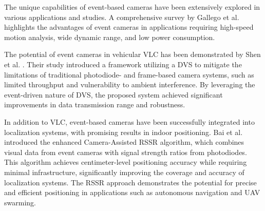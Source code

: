 The unique capabilities of event-based cameras have been extensively explored in various applications and studies.
A comprehensive survey by Gallego et al. \cite{gallego2020event} highlights the advantages of event cameras in
applications requiring high-speed motion analysis, wide dynamic range, and low power consumption.

The potential of event cameras in vehicular \ac{VLC} has been demonstrated by Shen et al.
\cite{shen2019vehicular}. Their study introduced a framework utilizing a \ac{DVS} to mitigate the limitations of
traditional photodiode- and frame-based camera systems, such as limited throughput and vulnerability to ambient
interference. By leveraging the event-driven nature of DVS, the proposed system achieved significant improvements
in data transmission range and robustness.

In addition to VLC, event-based cameras have been successfully integrated into localization systems, with promising
results in indoor positioning. Bai et al. \cite{bai2021vlp} introduced the enhanced Camera-Assisted \ac{RSSR}
algorithm, which combines visual data from event cameras with signal strength ratios from photodiodes.
This algorithm achieves centimeter-level positioning accuracy while requiring minimal infrastructure,
significantly improving the coverage and accuracy of localization systems. The RSSR approach demonstrates the
potential for precise and efficient positioning in applications such as autonomous navigation and UAV swarming.